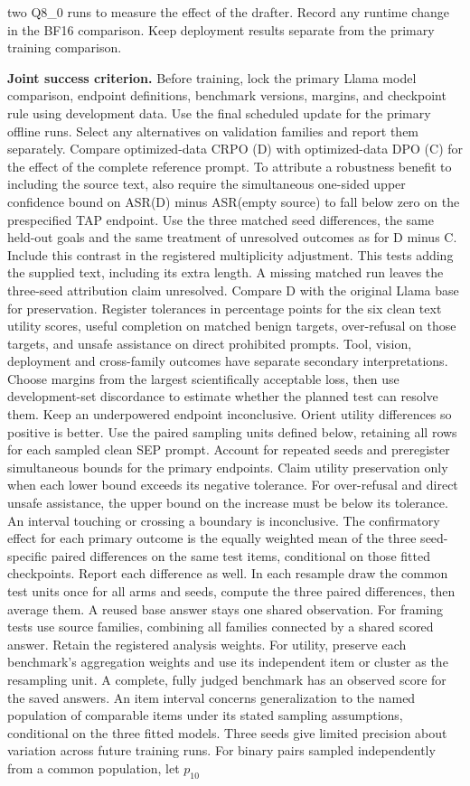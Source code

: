 \documentclass[11pt]{article}
\begin{document}
two Q8\_0 runs to measure the effect of the drafter. Record any runtime change in the BF16 comparison. Keep deployment results separate from the primary training comparison.

\textbf{Joint success criterion.} Before training, lock the primary Llama model comparison, endpoint definitions, benchmark versions, margins, and checkpoint rule using development data. Use the final scheduled update for the primary offline runs. Select any alternatives on validation families and report them separately. Compare optimized-data CRPO (D) with optimized-data DPO (C) for the effect of the complete reference prompt. To attribute a robustness benefit to including the source text, also require the simultaneous one-sided upper confidence bound on ASR(D) minus ASR(empty source) to fall below zero on the prespecified TAP endpoint. Use the three matched seed differences, the same held-out goals and the same treatment of unresolved outcomes as for D minus C. Include this contrast in the registered multiplicity adjustment. This tests adding the supplied text, including its extra length. A missing matched run leaves the three-seed attribution claim unresolved. Compare D with the original Llama base for preservation. Register tolerances in percentage points for the six clean text utility scores, useful completion on matched benign targets, over-refusal on those targets, and unsafe assistance on direct prohibited prompts. Tool, vision, deployment and cross-family outcomes have separate secondary interpretations. Choose margins from the largest scientifically acceptable loss, then use development-set discordance to estimate whether the planned test can resolve them. Keep an underpowered endpoint inconclusive. Orient utility differences so positive is better. Use the paired sampling units defined below, retaining all rows for each sampled clean SEP prompt. Account for repeated seeds and preregister simultaneous bounds for the primary endpoints. Claim utility preservation only when each lower bound exceeds its negative tolerance. For over-refusal and direct unsafe assistance, the upper bound on the increase must be below its tolerance. An interval touching or crossing a boundary is inconclusive. The confirmatory effect for each primary outcome is the equally weighted mean of the three seed-specific paired differences on the same test items, conditional on those fitted checkpoints. Report each difference as well. In each resample draw the common test units once for all arms and seeds, compute the three paired differences, then average them. A reused base answer stays one shared observation. For framing tests use source families, combining all families connected by a shared scored answer. Retain the registered analysis weights. For utility, preserve each benchmark's aggregation weights and use its independent item or cluster as the resampling unit. A complete, fully judged benchmark has an observed score for the saved answers. An item interval concerns generalization to the named population of comparable items under its stated sampling assumptions, conditional on the three fitted models. Three seeds give limited precision about variation across future training runs. For binary pairs sampled independently from a common population, let $p_{10}$ 
\end{document}
